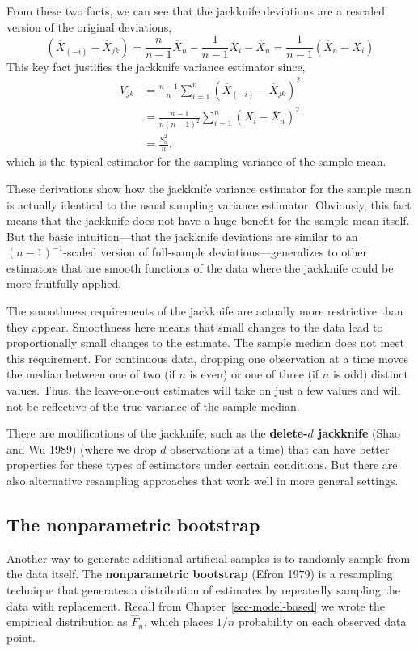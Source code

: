 \documentclass[
  13pt,
  letterpaper,
  DIV=11,
  numbers=noendperiod]{scrreprt}
\newcommand{\Xbar}{\overline{X}}
\theoremstyle{plain}
\theoremstyle{plain}
\theoremstyle{definition}
\theoremstyle{definition}
\theoremstyle{remark}
\begin{document}
From these two facts, we can see that the jackknife deviations are a
rescaled version of the original deviations, \[
(\Xbar_{(-i)} - \Xbar_{jk}) = \frac{n}{n-1} \Xbar_n - \frac{1}{n-1} X_i - \Xbar_n = \frac{1}{n-1}(\Xbar_n - X_i)
\] This key fact justifies the jackknife variance estimator since, \[
\begin{aligned}
V_{jk} &= \frac{n-1}{n} \sum_{i=1}^n (\Xbar_{(-i)} - \Xbar_{jk})^2 \\
&= \frac{n-1}{n(n-1)^2} \sum_{i=1}^n (X_i -\Xbar_n)^2 \\
&=\frac{S^2_n}{n},
\end{aligned}
\] which is the typical estimator for the sampling variance of the
sample mean.

These derivations show how the jackknife variance estimator for the
sample mean is actually identical to the usual sampling variance
estimator. Obviously, this fact means that the jackknife does not have a
huge benefit for the sample mean itself. But the basic intuition---that
the jackknife deviations are similar to an \((n-1)^{-1}\)-scaled version
of full-sample deviations---generalizes to other estimators that are
smooth functions of the data where the jackknife could be more
fruitfully applied.

The smoothness requirements of the jackknife are actually more
restrictive than they appear. Smoothness here means that small changes
to the data lead to proportionally small changes to the estimate. The
sample median does not meet this requirement. For continuous data,
dropping one observation at a time moves the median between one of two
(if \(n\) is even) or one of three (if \(n\) is odd) distinct values.
Thus, the leave-one-out estimates will take on just a few values and
will not be reflective of the true variance of the sample median.

There are modifications of the jackknife, such as the
\textbf{delete-\(d\) jackknife} (Shao and Wu 1989) (where we drop \(d\)
observations at a time) that can have better properties for these types
of estimators under certain conditions. But there are also alternative
resampling approaches that work well in more general settings.

\subsection{The nonparametric
bootstrap}\label{the-nonparametric-bootstrap}

Another way to generate additional artificial samples is to randomly
sample from the data itself. The \textbf{nonparametric bootstrap} (Efron
1979) is a resampling technique that generates a distribution of
estimates by repeatedly sampling the data with replacement. Recall from
Chapter~\ref{sec-model-based} we wrote the empirical distribution as
\(\widehat{F}_n\), which places \(1/n\) probability on each observed
data point.
\end{document}
